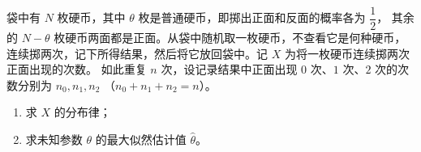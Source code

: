 \begin{question}[index=22,points=12]
袋中有 $N$ 枚硬币，其中 $\theta$ 枚是普通硬币，即掷出正面和反面的概率各为 $\dfrac12$，
其余的 $N-\theta$ 枚硬币两面都是正面。从袋中随机取一枚硬币，不查看它是何种硬币，
连续掷两次，记下所得结果，然后将它放回袋中。记 $X$ 为将一枚硬币连续掷两次正面出现的次数。
如此重复 $n$ 次，设记录结果中正面出现 $0$ 次、$1$ 次、$2$ 次的次数分别为 $n_0,n_1,n_2$
（$n_0+n_1+n_2=n$）。
\begin{enumerate}[label=（\arabic*）,leftmargin=2.5em,labelsep=.4em,itemsep=3pt,topsep=3pt]
\item 求 $X$ 的分布律；
\item 求未知参数 $\theta$ 的最大似然估计值 $\widehat{\theta}$。
\end{enumerate}
\end{question}
\WorkSpace
